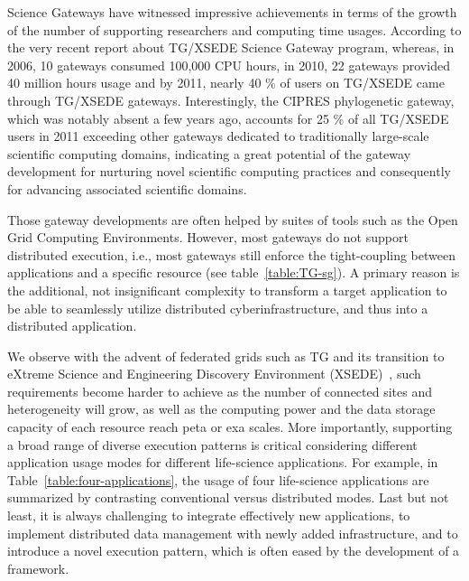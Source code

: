 \documentclass[]{svjour3}
\begin{document}
Science Gateways have witnessed impressive achievements in terms of
the growth of the number of supporting researchers and computing time
usages\cite{gce11-nancy}. According to the very recent report about
TG/XSEDE Science Gateway program\cite{gce11-nancy}, whereas, in 2006,
10 gateways consumed 100,000 CPU hours, in 2010, 22 gateways provided
40 million hours usage and by 2011, nearly 40 \% of users on TG/XSEDE
came through TG/XSEDE gateways. Interestingly, the CIPRES phylogenetic
gateway, which was notably absent a few years ago, accounts for 25 \%
of all TG/XSEDE users in 2011 exceeding other gateways dedicated to
traditionally large-scale scientific computing domains, indicating a
great potential of the gateway development for nurturing novel
scientific computing practices and consequently for advancing
associated scientific domains.

Those gateway developments are often helped by suites of tools such as the Open Grid Computing
Environments\cite{ogce-2010}. However, most gateways do not support
distributed execution, i.e., most gateways still enforce the
tight-coupling between applications and a specific resource (see
table~\ref{table:TG-sg}). A primary reason is the additional, not
insignificant complexity to transform a target application to be able
to seamlessly utilize distributed cyberinfrastructure, and thus into a
distributed application.

We observe with the advent of federated grids such as TG and its
transition to eXtreme Science and Engineering Discovery Environment (XSEDE)~\cite{XSEDE}, such requirements
become harder to achieve as the number of connected sites and
heterogeneity will grow, as well as the computing power and the data
storage capacity of each resource reach peta or exa scales. More
importantly, supporting a broad range of diverse execution patterns is
critical considering different application usage modes for different
life-science applications. For example, in Table~\ref{table:four-applications}, the usage of four life-science
applications are summarized by contrasting conventional versus
distributed modes.
  Last but not least, it is always challenging to integrate effectively new
applications, to implement distributed data management with newly added infrastructure, and to introduce
a novel execution pattern, which is often eased by
the development of a framework.
\end{document}
